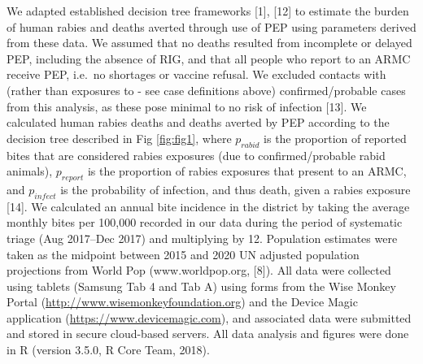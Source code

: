 \documentclass[
  oneside]{book}
\begin{document}
We adapted established decision tree frameworks {[}1{]}, {[}12{]} to estimate the burden of human rabies and deaths averted through use of PEP using parameters derived from these data. We assumed that no deaths resulted from incomplete or delayed PEP, including the absence of RIG, and that all people who report to an ARMC receive PEP, i.e.~no shortages or vaccine refusal. We excluded contacts with (rather than exposures to - see case definitions above) confirmed/probable cases from this analysis, as these pose minimal to no risk of infection {[}13{]}. We calculated human rabies deaths and deaths averted by PEP according to the decision tree described in Fig \ref{fig:fig1}, where \(p_{rabid}\) is the proportion of reported bites that are considered rabies exposures (due to confirmed/probable rabid animals), \(p_{report}\) is the proportion of rabies exposures that present to an ARMC, and \(p_{infect}\) is the probability of infection, and thus death, given a rabies exposure {[}14{]}. We calculated an annual bite incidence in the district by taking the average monthly bites per 100,000 recorded in our data during the period of systematic triage (Aug 2017--Dec 2017) and multiplying by 12. Population estimates were taken as the midpoint between 2015 and 2020 UN adjusted population projections from World Pop (www.worldpop.org, {[}8{]}). All data were collected using tablets (Samsung Tab 4 and Tab A) using forms from the Wise Monkey Portal (\url{http://www.wisemonkeyfoundation.org}) and the Device Magic application (\url{https://www.devicemagic.com}), and associated data were submitted and stored in secure cloud-based servers. All data analysis and figures were done in R (version 3.5.0, R Core Team, 2018).
\end{document}
